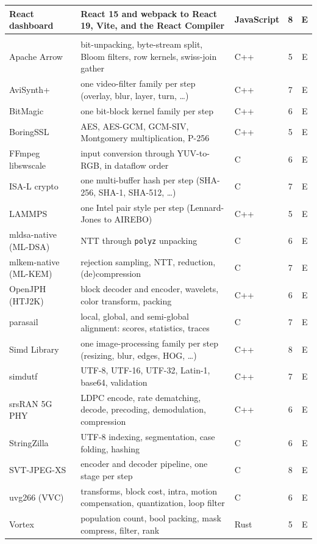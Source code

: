\documentclass{article}
\begin{document}
{\begin{longtable}{@{}>{\raggedright\arraybackslash}p{3.8cm} >{\raggedright\arraybackslash}p{8.6cm} l c c@{}}
  React dashboard & React 15 and webpack to React 19, Vite, and the React Compiler & JavaScript & 8 & E \\
  \midrule
  \multicolumn{5}{@{}l}{\textit{Optimization (18 tasks)}} \\
  Apache Arrow & bit-unpacking, byte-stream split, Bloom filters, row kernels, swiss-join gather & C++ & 5 & E \\
  AviSynth+ & one video-filter family per step (overlay, blur, layer, turn, \ldots) & C++ & 7 & E \\
  BitMagic & one bit-block kernel family per step & C++ & 6 & E \\
  BoringSSL & AES, AES-GCM, GCM-SIV, Montgomery multiplication, P-256 & C++ & 5 & E \\
  FFmpeg libswscale & input conversion through YUV-to-RGB, in dataflow order & C & 6 & E \\
  ISA-L crypto & one multi-buffer hash per step (SHA-256, SHA-1, SHA-512, \ldots) & C & 7 & E \\
  LAMMPS & one Intel pair style per step (Lennard-Jones to AIREBO) & C++ & 5 & E \\
  mldsa-native (ML-DSA) & NTT through \texttt{polyz} unpacking & C & 6 & E \\
  mlkem-native (ML-KEM) & rejection sampling, NTT, reduction, (de)compression & C & 7 & E \\
  OpenJPH (HTJ2K) & block decoder and encoder, wavelets, color transform, packing & C++ & 6 & E \\
  parasail & local, global, and semi-global alignment: scores, statistics, traces & C & 7 & E \\
  Simd Library & one image-processing family per step (resizing, blur, edges, HOG, \ldots) & C++ & 8 & E \\
  simdutf & UTF-8, UTF-16, UTF-32, Latin-1, base64, validation & C++ & 7 & E \\
  srsRAN 5G PHY & LDPC encode, rate dematching, decode, precoding, demodulation, compression & C++ & 6 & E \\
  StringZilla & UTF-8 indexing, segmentation, case folding, hashing & C & 6 & E \\
  SVT-JPEG-XS & encoder and decoder pipeline, one stage per step & C & 8 & E \\
  uvg266 (VVC) & transforms, block cost, intra, motion compensation, quantization, loop filter & C & 6 & E \\
  Vortex & population count, bool packing, mask compress, filter, rank & Rust & 5 & E \\

\end{longtable}}
\end{document}
